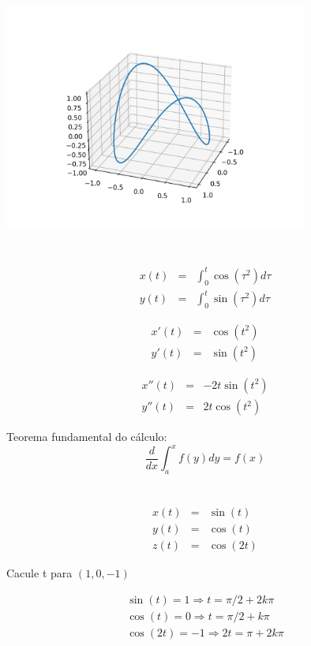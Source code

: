 \documentclass[a4paper,10pt]{article}
\begin{document}
 \begin{center}
 \includegraphics[width=10cm]{figs/curva_cs.png}
 \end{center}
 
 \section{}
\begin{eqnarray*}
  x(t) &=& \int_0^t\cos(\tau^2)d\tau\\
  y(t) &=& \int_0^t\sin(\tau^2)d\tau
\end{eqnarray*}
 
\begin{eqnarray*}
  x'(t) &=& \cos(t^2)\\
  y'(t) &=& \sin(t^2)
\end{eqnarray*}

\begin{eqnarray*}
  x''(t) &=& -2t\sin(t^2)\\
  y''(t) &=& 2t\cos(t^2)
\end{eqnarray*}

Teorema fundamental do cálculo:
$$\frac{d}{dx} \int_a^x f(y)dy = f(x)$$
 
 
 \section{}
 \begin{eqnarray*}
  x(t) &=& \sin(t)\\
  y(t) &=& \cos(t)\\
  z(t) &=& \cos(2t)
 \end{eqnarray*}
 
 Cacule t para $(1,0,-1)$
 
 \begin{eqnarray*}
\sin(t)=1 \Longrightarrow t = \pi/2 + 2k\pi\\
\cos(t)=0 \Longrightarrow t = \pi/2 + k\pi\\
 \cos(2t)=-1 \Longrightarrow 2t = \pi + 2k\pi\\
 \end{eqnarray*}
\end{document}

